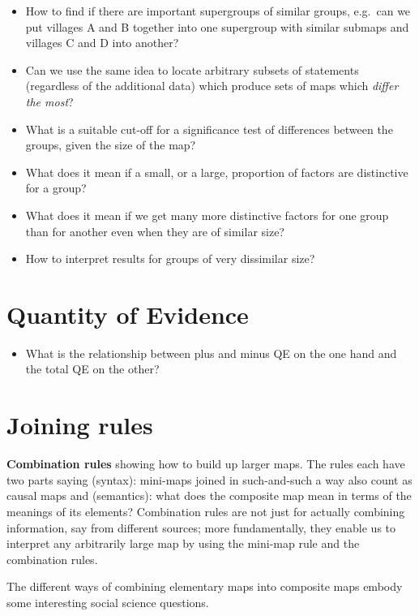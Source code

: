 \documentclass[
]{book}
\providecommand{\tightlist}{%
  \setlength{\itemsep}{0pt}\setlength{\parskip}{0pt}}
\begin{document}
\begin{itemize}
\item
  How to find if there are important supergroups of similar groups, e.g.~can we put villages A and B together into one supergroup with similar submaps and villages C and D into another?
\item
  Can we use the same idea to locate arbitrary subsets of statements (regardless of the additional data) which produce sets of maps which \emph{differ the most}?
\item
  What is a suitable cut-off for a significance test of differences between the groups, given the size of the map?
\item
  What does it mean if a small, or a large, proportion of factors are distinctive for a group?
\item
  What does it mean if we get many more distinctive factors for one group than for another even when they are of similar size?
\item
  How to interpret results for groups of very dissimilar size?
\end{itemize}

\hypertarget{quantity-of-evidence}{%
\section{Quantity of Evidence}\label{quantity-of-evidence}}

\begin{itemize}
\tightlist
\item
  What is the relationship between plus and minus QE on the one hand and the total QE on the other?
\end{itemize}

\hypertarget{joining-rules}{%
\section{Joining rules}\label{joining-rules}}

\textbf{Combination rules} showing how to build up larger maps. The rules each have two parts saying (syntax): mini-maps joined in such-and-such a way also count as causal maps and (semantics): what does the composite map mean in terms of the meanings of its elements? Combination rules are not just for actually combining information, say from different sources; more fundamentally, they enable us to interpret any arbitrarily large map by using the mini-map rule and the combination rules.

The different ways of combining elementary maps into composite maps embody some interesting social science questions.
\end{document}
